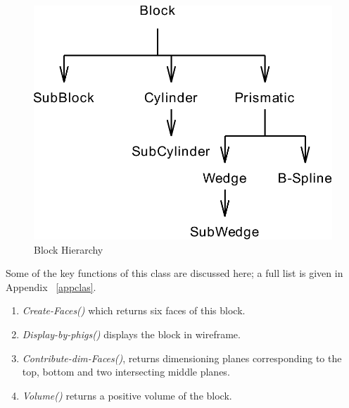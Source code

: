 	        \begin{figure}[htbp]
\includegraphics{SHAPES.pdf}
            \caption{Block Hierarchy}
            \label{shapes}
        	\end{figure}

        Some of the key functions of this class are discussed here; a full list
        is given in Appendix ~\ref{appclas}.

            \begin{enumerate}
			\item
            {\em Create-Faces() } which returns six faces of this block.
            \item
            {\em Display-by-phigs()} displays the block in wireframe.
            \item
                {\em Contribute-dim-Faces()}, returns dimensioning planes
                corresponding to the top, bottom and two intersecting middle
                planes.
			\item
			{\em Volume()} returns a positive volume of the block.

            \end{enumerate}


